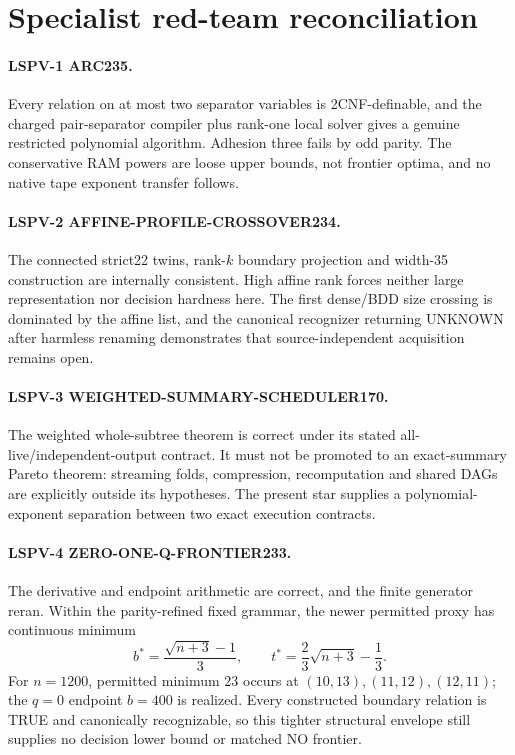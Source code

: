 \documentclass[11pt]{article}
\begin{document}
\section{Specialist red-team reconciliation}

\paragraph{LSPV-1 ARC235.}
Every relation on at most two separator variables is 2CNF-definable, and the charged pair-separator
compiler plus rank-one local solver gives a genuine restricted polynomial algorithm.  Adhesion three
fails by odd parity.  The conservative RAM powers are loose upper bounds, not frontier optima, and no
native tape exponent transfer follows.

\paragraph{LSPV-2 AFFINE-PROFILE-CROSSOVER234.}
The connected strict22 twins, rank-$k$ boundary projection and width-35 construction are internally
consistent.  High affine rank forces neither large representation nor decision hardness here.  The
first dense/BDD size crossing is dominated by the affine list, and the canonical recognizer returning
UNKNOWN after harmless renaming demonstrates that source-independent acquisition remains open.

\paragraph{LSPV-3 WEIGHTED-SUMMARY-SCHEDULER170.}
The weighted whole-subtree theorem is correct under its stated all-live/independent-output contract.
It must not be promoted to an exact-summary Pareto theorem: streaming folds, compression,
recomputation and shared DAGs are explicitly outside its hypotheses.  The present star supplies a
polynomial-exponent separation between two exact execution contracts.

\paragraph{LSPV-4 ZERO-ONE-Q-FRONTIER233.}
The derivative and endpoint arithmetic are correct, and the finite generator reran.  Within the
parity-refined fixed grammar, the newer permitted proxy has continuous minimum
\[
b^*=\frac{\sqrt{n+3}-1}{3},\qquad
t^*=\frac23\sqrt{n+3}-\frac13.
\]
For $n=1200$, permitted minimum 23 occurs at $(10,13),(11,12),(12,11)$; the $q=0$ endpoint
$b=400$ is realized.  Every constructed boundary relation is TRUE and canonically recognizable, so
this tighter structural envelope still supplies no decision lower bound or matched NO frontier.
\end{document}

